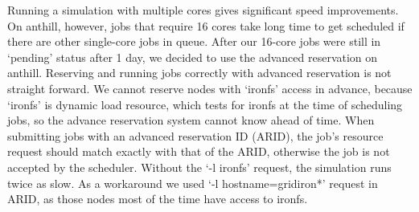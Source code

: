 Running a simulation with multiple cores gives significant speed improvements.
On anthill, however, jobs that require 16 cores take long time to get scheduled if there are other single-core jobs in queue.
After our 16-core jobs were still in `pending' status after 1 day, we decided to use the advanced reservation on anthill\cite{anthill-ar}.
Reserving and running jobs correctly with advanced reservation is not straight forward.
We cannot reserve nodes with `ironfs' access in advance, because `ironfs' is dynamic load resource, which tests for ironfs at the time of scheduling jobs, so the advance reservation system cannot know ahead of time.
When submitting jobs with an advanced reservation ID (ARID), the job's resource request should match exactly with that of the ARID, otherwise the job is not accepted by the scheduler.
Without the `-l ironfs' request, the simulation runs twice as slow.
As a workaround we used `-l hostname=gridiron*' request in ARID, as those nodes most of the time have access to ironfs\cite{tim:email}.



